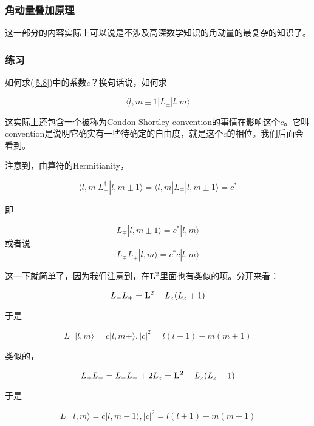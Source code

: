 \subsubsection{角动量叠加原理}

这一部分的内容实际上可以说是不涉及高深数学知识的角动量的最复杂的知识了。


\newpage
\subsubsection{练习}
如何求(\ref{5.8})中的系数$c$？换句话说，如何求

\begin{equation}
\langle l,m\pm1|L_{\pm}|l,m\rangle
\end{equation}

这实际上还包含一个被称为Condon-Shortley convention的事情在影响这个$c$。它叫convention是说明它确实有一些待确定的自由度，就是这个$c$的相位。我们后面会看到。

注意到，由算符的Hermitianity，

\begin{equation}
\langle l,m|L_{\pm}^{\dagger}|l,m\pm1\rangle = \langle l,m|L_{\mp}|l,m\pm1\rangle = c^*
\end{equation}

即

\begin{equation}
L_{\mp}|l,m\pm1\rangle = c^*|l,m\rangle
\end{equation}
或者说
\begin{equation}
L_{\mp}L_{\pm}|l,m\rangle = c^*c|l,m\rangle
\end{equation}

这一下就简单了，因为我们注意到，在${\bf L}^2$里面也有类似的项。分开来看：

\begin{equation}
L_-L_+ = {\bf L}^2 - L_z(L_z+1)
\end{equation}

于是

\begin{equation}
L_+|l,m\rangle = c|l,m+\rangle, |c|^2 = l(l+1)-m(m+1)
\end{equation}

类似的，

\begin{equation}
L_+L_- = L_-L_+ +2L_z = {\bf L^2} -L_z(L_z-1)
\end{equation}

于是

\begin{equation}
L_-|l,m\rangle = c|l,m-1\rangle, |c|^2 = l(l+1)-m(m-1) 
\end{equation}

